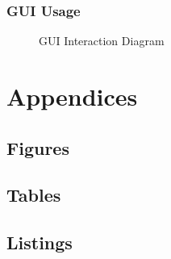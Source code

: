 \documentclass[11pt]{article}
\begin{document}
            \subsubsection{GUI Usage}
                \begin{figure}[H]
                    \centering
                    \caption{GUI Interaction Diagram}
                \end{figure}
                \newpage

    \section{Appendices}
        \subsection{Figures}
            \listoffigures

        \newpage

        \subsection{Tables}
            \listoftables

        \newpage

        \subsection{Listings}
            \lstlistoflistings
\end{document}

